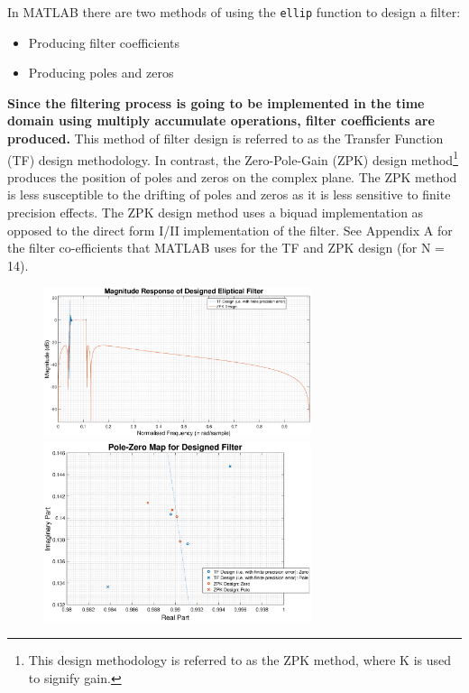 \documentclass{article}
\begin{document}
In MATLAB there are two methods of using the {\tt ellip} function to design a filter: \begin{itemize}
    \item Producing filter coefficients
    \item Producing poles and zeros
\end{itemize} 
\textbf{Since the filtering process is going to be implemented in the time domain using multiply accumulate operations, filter coefficients are produced.} This method of filter design is referred to as the Transfer Function (TF) design methodology. In contrast, the Zero-Pole-Gain (ZPK) design method\footnote{This design methodology is referred to as the ZPK method, where K is used to signify gain.} produces the position of poles and zeros on the complex plane. The ZPK method is less susceptible to the drifting of poles and zeros as it is less sensitive to finite precision effects. The ZPK design method uses a biquad implementation as opposed to the direct form I/II implementation of the filter. See Appendix A for the filter co-efficients that MATLAB uses for the TF and ZPK design (for N = 14). 


\begin{figure}[H]
    \centering
    \includegraphics[width = 0.70\textwidth]{moniri_2}
    \includegraphics[width = 0.70\textwidth]{moniri_1}
    \caption{}
    \label{fig:moniri}
\end{figure}
\end{document}
